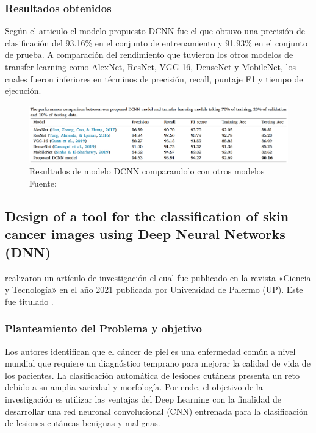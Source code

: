 \subsubsection{Resultados obtenidos}
Según el articulo el modelo propuesto DCNN fue el que obtuvo una precisión de clasificación del 93.16\% en el conjunto de entrenamiento y 91.93\% en el conjunto de prueba. A comparación del rendimiento que tuvieron los otros modelos de transfer learning como AlexNet, ResNet, VGG-16, DenseNet y MobileNet, los cuales fueron inferiores en términos de precisión, recall, puntaje F1 y tiempo de ejecución.

\begin{figure}[h]
	\begin{center}
		\includegraphics[width=1\textwidth]{2/figuras/Problematica_An_enhanced_tecniques_imagen_01.png}
		\caption{Resultados de modelo DCNN comparandolo con otros modelos Fuente: \cite{ali_2021enhanced}}
		\label{1:fig 6}
	\end{center}
\end{figure}




\subsection{Design of a tool for the classification of skin cancer images using Deep Neural Networks (DNN) \citep*{vargas_2021diseno}}

\citeauthor{vargas_2021diseno} realizaron un artículo de investigación el cual fue publicado en la revista «Ciencia y Tecnología» en el año 2021 publicada por Universidad de Palermo (UP). Este fue titulado .


\subsubsection{Planteamiento del Problema y objetivo}
Los autores identifican que el cáncer de piel es una enfermedad común a nivel mundial que requiere un diagnóstico temprano para mejorar la calidad de vida de los pacientes. La clasificación automática de lesiones cutáneas presenta un reto debido a su amplia variedad y morfología. Por ende, el objetivo de la investigación es utilizar las ventajas del Deep Learning con la finalidad de desarrollar una red neuronal convolucional (CNN) entrenada para la clasificación de lesiones cutáneas benignas y malignas.


